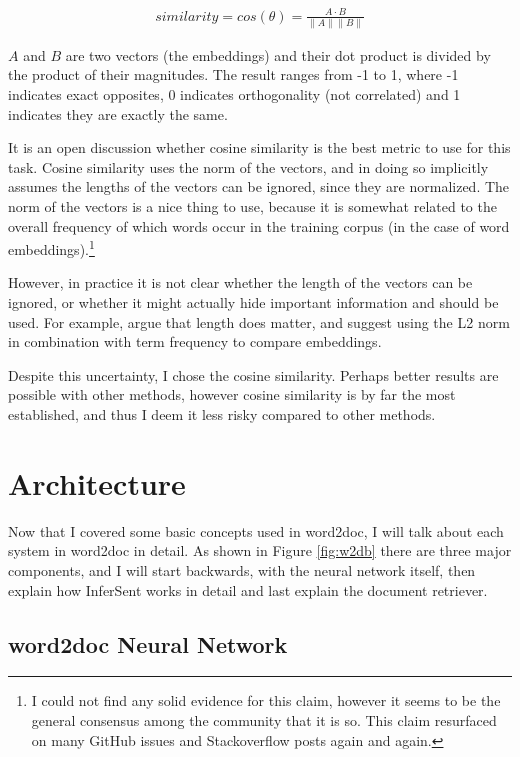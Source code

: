 \begin{gather}
similarity = cos(\theta) = \frac{A \cdot B}{\parallel A \parallel \parallel B \parallel}
\end{gather}

$A$ and $B$ are two vectors (the embeddings) and their dot product is divided by the product of their magnitudes. The result ranges
from -1 to 1, where -1 indicates exact opposites, 0 indicates orthogonality (not correlated) and 1 indicates they are exactly the same.

It is an open discussion whether cosine similarity is the best metric to use for this task. Cosine similarity uses the
norm of the vectors, and in doing so implicitly assumes the lengths of the vectors can be ignored, since they are normalized.
The norm of the vectors is a nice thing to use, because it is somewhat related to the overall frequency of which words occur in
the training corpus (in the case of word embeddings).\footnote{I could not find any solid evidence for this claim, however it seems to
be the general consensus among the community that it is so. This claim resurfaced on many GitHub issues and Stackoverflow posts
again and again.}

However, in practice it is not clear whether the length of the vectors can be ignored, or whether it might actually hide important
information and should be used. For example, \citet{schakelw15} argue that length does matter, and suggest using the L2 norm
in combination with term frequency to compare embeddings.

Despite this uncertainty, I chose the cosine similarity. Perhaps better results are possible with other methods, however cosine
similarity is by far the most established, and thus I deem it less risky compared to other methods.


\section{Architecture}

Now that I covered some basic concepts used in word2doc, I will talk about each system in word2doc in detail. As shown in
Figure \ref{fig:w2db} there are three major components, and I will start backwards, with the neural network itself, then explain
how InferSent works in detail and last explain the document retriever.


\subsection{word2doc Neural Network}
\label{theory:w2d-net}

